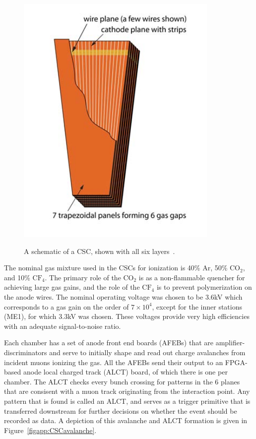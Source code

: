 \begin{figure}[!Hh]
       \centering
       \includegraphics[scale=0.8]{Figures/CSClayout.png} \\
       \caption[The layout of a cathode strip chamber.]{A schematic of a CSC, shown with all six layers~\cite{CMSdetector}.}
\label{figapp:CSClayout}
\end{figure}



The nominal gas mixture used in the CSCs for ionization is 40\% Ar, 50\% $\text{CO}_2$, and 10\% $\text{CF}_4$.  The primary role of the $\text{CO}_2$ is as a non-flammable quencher for achieving large gas gains, and the role of the $\text{CF}_4$ is to prevent polymerization on the anode wires.  The nominal operating voltage was chosen to be 3.6kV which corresponds to a gas gain on the order of $7 \times 10^4$, except for the inner stations (ME1), for which 3.3kV was chosen.  These voltages provide very high efficiencies with an adequate signal-to-noise ratio.  

Each chamber has a set of anode front end boards (AFEBs) that are amplifier-discriminators and serve to initially shape and read out charge avalanches from incident muons ionizing the gas.  All the AFEBs send their output to an FPGA-based anode local charged track (ALCT) board, of which there is one per chamber.  The ALCT checks every bunch crossing for patterns in the 6 planes that are consisent with a muon track originating from the interaction point.  Any pattern that is found is called an ALCT, and serves as a trigger primitive that is transferred downstream for further decisions on whether the event should be recorded as data.  A depiction of this avalanche and ALCT formation is given in Figure~\ref{figapp:CSCavalanche}.


